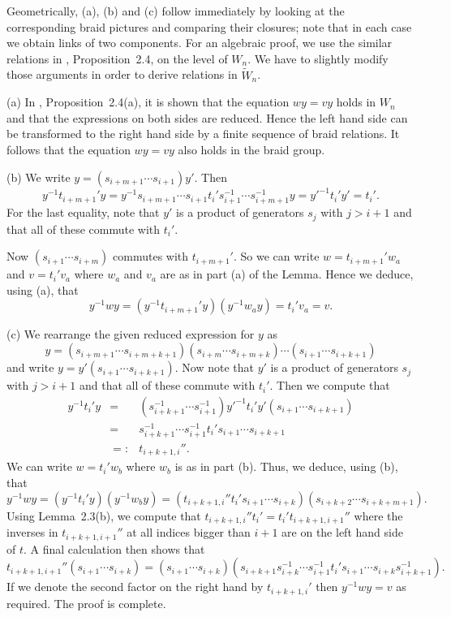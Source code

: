 \begin{pf} Geometrically, (a), (b) and (c) follow immediately by looking 
at  the corresponding braid  pictures and comparing their closures; note that
in each case we obtain links  of two components.  For an algebraic proof,
we  use the similar relations   in \cite{GP}, Proposition~2.4, on  the
level of $W_n$.   We have to slightly  modify those arguments in order
to derive relations in $\tilde{W}_n$.

(a)  In \cite{GP}, Proposition~2.4(a), it   is shown that the equation
$wy=vy$ holds  in $W_n$ and  that the  expressions  on both sides  are
reduced.  Hence the  left hand side  can be  transformed to  the right
hand side by  a finite sequence of braid  relations.   It follows that
the equation $wy=vy$ also holds in the braid group.

(b) We write $y=(s_{i+m+1} \cdots s_{i+1})y'$. Then 
\[ y^{-1}t_{i+m+1}'y= y^{-1}s_{i+m+1} \cdots s_{i+1}t_i's_{i+1}^{-1} \cdots
s_{i+m+1}^{-1}y = {y'}^{-1}t_i'y'=t_i'.\]  For the last equality, note
that $y'$ is  a product of generators $s_j$  with $j>i+1$ and that all
of these commute with $t_i'$.

Now $(s_{i+1} \cdots s_{i+m})$  commutes with $t_{i+m+1}'$. So we  can
write $w=t_{i+m+1}'w_a$ and $v=t_i'v_a$  where $w_a$ and $v_a$  are as
in part (a) of the Lemma. Hence we deduce, using (a), that
\[ y^{-1}wy=(y^{-1}t_{i+m+1}'y)(y^{-1}w_ay)=t_i'v_a=v.\]

(c) We rearrange the given reduced expression for $y$ as 
\[ y=(s_{i+m+1} \cdots s_{i+m+k+1})  (s_{i+m} \cdots s_{i+m+k}) \cdots  
(s_{i+1} \cdots    s_{i+k+1})\]   and write   $y=y'(s_{i+1}     \cdots
s_{i+k+1})$.  Now note that $y'$ is a product of generators $s_j$ with
$j>i+1$ and  that all of these  commute  with $t_i'$. Then  we compute
that
\begin{eqnarray*}
y^{-1}t_i'y     &          =      &        (s_{i+k+1}^{-1}      \cdots
s_{i+1}^{-1}){y'}^{-1}t_i'y'(s_{i+1}  \cdots    s_{i+k+1}) \\  &   = &
s_{i+k+1}^{-1} \cdots s_{i+1}^{-1}t_i's_{i+1} \cdots s_{i+k+1} \\ & =:
& t_{i+k+1,i}''. \end{eqnarray*} We can  write $w=t_i'w_b$ where $w_b$
is as in part (b). Thus, we deduce, using (b), that
\[y^{-1}wy = (y^{-1}t_i'y)(y^{-1}w_by) = 
(t_{i+k+1,i}''t_i's_{i+1} \cdots s_{i+k})(s_{i+k+2} \cdots s_{i+k+m+1}).\]
Using Lemma~2.3(b), we compute that $t_{i+k+1,i}''t_i'=t_i't_{i+k+1,i+1}''$
where the inverses in $t_{i+k+1,i+1}''$ at all indices bigger than $i+1$ 
are on the left hand side of $t$. A final calculation then shows that 
\[t_{i+k+1,i+1}''(s_{i+1} \cdots s_{i+k})=(s_{i+1} \cdots s_{i+k})
(s_{i+k+1}s_{i+k}^{-1} \cdots s_{i+1}^{-1}t_i's_{i+1} \cdots 
s_{i+k}s_{i+k+1}^{-1}).\]
If we denote the second factor on the right hand by $t_{i+k+1,i}'$ then
$y^{-1}wy=v$ as required.  The proof is complete.  \end{pf}

